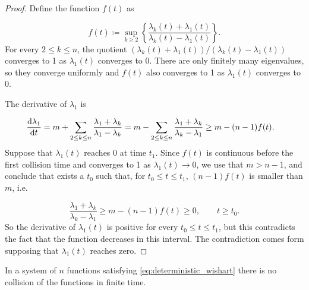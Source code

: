 \begin{proof}

Define the function $f(t)$ as

    \begin{equation*}
        f(t) \coloneqq \sup_{k\ge 2}\left\{ \frac{\lambda_k(t) + \lambda_1(t)}{\lambda_k(t) - \lambda_1(t)} \right\}.
    \end{equation*}
    For every $2 \le k\le n$, the quotient $(\lambda_k(t) + \lambda_1(t))/( \lambda_k(t) - \lambda_1(t) )$ converges to 1 as $\lambda_1(t)$ converges to 0. There are only finitely many eigenvalues, so they converge uniformly and $f(t)$ also converges to 1 as $\lambda_1(t)$ converges to 0.

    The derivative of $\lambda_1$ is 
    
    \begin{align*}
        \frac{\mathrm d \lambda_1}{\mathrm d t} &= m + \sum_{2 \le k\le n} \frac{\lambda_1 + \lambda_k}{\lambda_1 - \lambda_k} = m - \sum_{2\le k \le n} \frac{\lambda_1+\lambda_k}{\lambda_k - \lambda_1} \ge m - (n-1)f(t).
    \end{align*}
    Suppose that $\lambda_1(t)$ reaches 0 at time $t_1$. Since $f(t)$ is continuous before the first collision time and converges to 1 as $\lambda_1(t) \to 0$, we use that $m > n-1$, and conclude that exists a $t_0$ such that, for $t_0 \le t\le t_1$, $(n-1)f(t)$ is smaller than $m$, i.e.

    \begin{equation*}
        \frac{\lambda_1+\lambda_k}{\lambda_k - \lambda_1} \ge m - (n-1)f(t) \ge 0, \qquad t\ge t_0.
    \end{equation*}
    So the derivative of $\lambda_1(t)$ is positive for every $t_0 \le t\le t_1$, but this contradicts the fact that the function decreases in this interval. The contradiction comes form supposing that $\lambda_1(t)$ reaches zero.
\end{proof}

\begin{corollary}
    In a system of $n$ functions satisfying \eqref{eq:deterministic_wishart} there is no collision of the functions in finite time.
\end{corollary}

